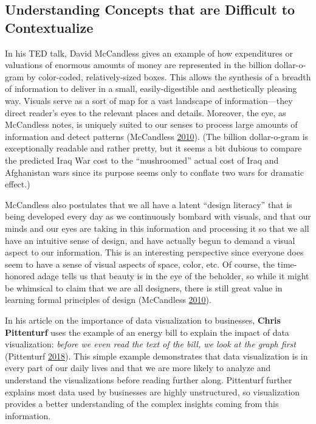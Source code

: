 \documentclass[]{book}
\begin{document}
\subsection{Understanding Concepts that are Difficult to
Contextualize}\label{understanding-concepts-that-are-difficult-to-contextualize}

In his TED talk, David McCandless gives an example of how expenditures
or valuations of enormous amounts of money are represented in the
billion dollar-o-gram by color-coded, relatively-sized boxes. This
allows the synthesis of a breadth of information to deliver in a small,
easily-digestible and aesthetically pleasing way. Visuals serve as a
sort of map for a vast landscape of information---they direct reader's
eyes to the relevant places and details. Moreover, the eye, as
McCandless notes, is uniquely suited to our senses to process large
amounts of information and detect patterns (McCandless
\protect\hyperlink{ref-viz_ted}{2010}). (The billion dollar-o-gram is
exceptionally readable and rather pretty, but it seems a bit dubious to
compare the predicted Iraq War cost to the ``mushroomed'' actual cost of
Iraq and Afghanistan wars since its purpose seems only to conflate two
wars for dramatic effect.)

McCandless also postulates that we all have a latent ``design literacy''
that is being developed every day as we continuously bombard with
visuals, and that our minds and our eyes are taking in this information
and processing it so that we all have an intuitive sense of design, and
have actually begun to demand a visual aspect to our information. This
is an interesting perspective since everyone does seem to have a sense
of visual aspects of space, color, etc. Of course, the time-honored
adage tells us that beauty is in the eye of the beholder, so while it
might be whimsical to claim that we are all designers, there is still
great value in learning formal principles of design (McCandless
\protect\hyperlink{ref-viz_ted}{2010}).

In his article on the importance of data visualization to businesses,
\textbf{Chris Pittenturf} uses the example of an energy bill to explain
the impact of data visualization: \emph{before we even read the text of
the bill, we look at the graph first} (Pittenturf
\protect\hyperlink{ref-viz_importance}{2018}). This simple example
demonstrates that data visualization is in every part of our daily lives
and that we are more likely to analyze and understand the visualizations
before reading further along. Pittenturf further explains most data used
by businesses are highly unstructured, so visualization provides a
better understanding of the complex insights coming from this
information.
\end{document}
